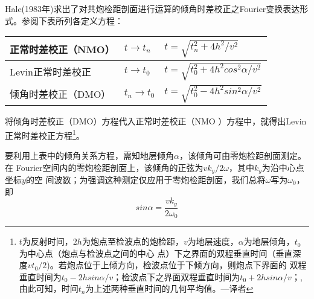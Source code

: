 Hale(1983年)求出了对共炮检距剖面进行运算的倾角时差校正之Fourier变换表达形
式。参阅下表所列各定义方程：
\begin{table}[!ht]
\centering
\ttfamily
\small
\begin{tabularx}{\textwidth}{|Y|Y|Y|}
\hline
正常时差校正（NMO）& $t\rightarrow t_n$ & $t=\sqrt{t_n^2+4h^2/v^2}$\\
\hline
Levin正常时差校正& $t\rightarrow t_0$ & $t=\sqrt{t_0^2+4h^2cos^2\alpha/v^2}$\\
\hline
倾角时差校正（DMO）& $t_n\rightarrow t_0$ & $t=\sqrt{t_0^2-4h^2sin^2\alpha/v^2}$\\
\hline
\end{tabularx}
\end{table}
将倾角时差校正（DMO）方程代入正常时差校正（NMO
）方程中，就得出Levin正常时差校正方程\footnote{
$t$为反射时间，$2h$为炮点至检波点的炮检距，$v$为地层速度，$\alpha$为地层倾角，$t_0$为中心点（炮点与检波点之间的中心
点）下之界面的双程垂直时间（垂直深度$vt_0/2$)。若炮点位于上倾方向，检波点位于下倾方向，则炮点下界面的
双程垂直时间为$t_0-2hsin\alpha/v$；检波点下之界面双程垂直时间为$t_0+2hsin\alpha/v$；,由此可知，时间$t_n$为上述两种垂直时间的几何平均值。---译者
}。

要利用上表中的倾角关系方程，需知地层倾角$\alpha$，该倾角可由零炮检距剖面测定。在
Fourier空间内的零炮检距剖面上，该倾角的正弦为$vk_y/2\omega$，其中$k_y$为沿中心点坐标$y$的空
间波数；为强调这种测定仅应用于零炮检距剖面，我们总将$\omega$写为$\omega_0$，即
\begin{equation}
sin\alpha = \frac{vk_y}{2\omega_0}
\label{eq:ex3.6.3}
\end{equation}



